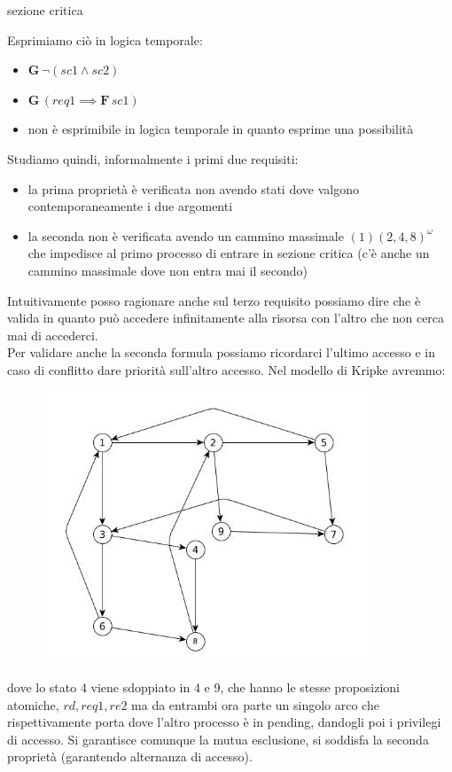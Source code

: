 \begin{esempio}
\begin{itemize}
    sezione critica
  \end{itemize}
  Esprimiamo ciò in logica temporale:
  \begin{itemize}
    \item $\mathbf{G}\,\neg(sc1\land sc2)$
    \item $\mathbf{G}\,(req1\implies \mathbf{F}\, sc1)$
    \item non è esprimibile in logica temporale in quanto esprime una
    possibilità 
  \end{itemize}
  Studiamo quindi, informalmente i primi due requisiti:
  \begin{itemize}
    \item la prima proprietà è verificata non avendo stati dove valgono
    contemporaneamente i due argomenti
    \item la seconda non è verificata avendo un cammino massimale
    $(1)(2, 4, 8)^\omega$ che impedisce al primo processo di entrare in sezione
    critica (c'è anche un cammino massimale dove non entra mai il secondo)
  \end{itemize}
  Intuitivamente posso ragionare anche sul terzo requisito possiamo dire che è
  valida in quanto può accedere infinitamente alla risorsa con l'altro che non
  cerca mai di accederci.\\
  Per validare anche la seconda formula possiamo ricordarci l'ultimo accesso e
  in caso di conflitto dare priorità sull'altro accesso. Nel modello di Kripke
  avremmo: 
  \begin{figure}[H]
    \centering
    \includegraphics[scale = 0.6]{img/mc3.jpg}
  \end{figure}
  dove lo stato 4 viene sdoppiato in 4 e 9, che hanno le stesse proposizioni
  atomiche, $rd, req1, re2$ ma da entrambi ora parte un singolo arco che
  rispettivamente porta dove l'altro processo è in pending, dandogli poi i
  privilegi di accesso. Si garantisce comunque la mutua esclusione, si soddisfa
  la seconda proprietà (garantendo alternanza di accesso).
\end{esempio}
